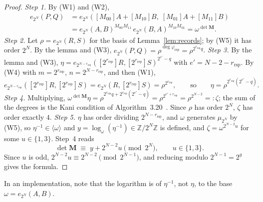 \documentclass[version=submission]{iacrcc}
\newcommand{\rrs}{r_{\mathrm{rsp}}}
\newcommand{\Mm}{\mathbf{M}}
\begin{document}
\begin{proof}
\emph{Step 1.} By (W1) and (W2),
\begin{align*}
  e_{2^N}(P, Q)
  &= e_{2^N}([M_{00}] A + [M_{10}] B,\; [M_{01}] A + [M_{11}] B) \\
  &= e_{2^N}(A, B)^{M_{00} M_{11}} \, e_{2^N}(B, A)^{M_{10} M_{01}}
  = \omega^{\det \Mm}.
\end{align*}
\emph{Step 2.} Let $\rho = e_{2^N}(R, S)$ for the basis of
Lemma~\ref{lem:records}; by (W5) it has order $2^N$. By the lemma and
(W3), $e_{2^N}(P, Q) = \rho^{\deg \varphi_{\mathrm{rsp}}} = \rho^{2^{\rrs}
q}$.
\emph{Step 3.} By the lemma and (W3), $\eta = e_{2^{N - \rrs}}([2^{\rrs}]
R, [2^{\rrs}] S)^{2^{e'} - q}$ with $e' = N - 2 - \rrs$. By (W4) with
$m = 2^{\rrs}$, $n = 2^{N - \rrs}$, and then (W1),
\[
  e_{2^{N - \rrs}}([2^{\rrs}] R, [2^{\rrs}] S)
  = e_{2^N}(R, [2^{\rrs}] S) = \rho^{2^{\rrs}},
  \qquad\text{so}\qquad
  \eta = \rho^{2^{\rrs}(2^{e'} - q)}.
\]
\emph{Step 4.} Multiplying, $\omega^{\det \Mm} \eta = \rho^{2^{\rrs} q +
2^{\rrs} (2^{e'} - q)} = \rho^{2^{e' + \rrs}} = \rho^{2^{N - 2}} =:
\zeta$; the sum of the degrees is the Kani condition of
Algorithm~3.20~\cite{kani}. Since $\rho$ has order $2^N$, $\zeta$ has
order exactly $4$.
\emph{Step 5.} $\eta$ has order dividing $2^{N - \rrs}$, and $\omega$ generates $\mu_{2^N}$ by (W5), so $\eta^{-1} \in \langle \omega \rangle$ and $y
= \log_\omega(\eta^{-1}) \in \mathbb{Z}/2^N\mathbb{Z}$ is defined, and
$\zeta = \omega^{2^{N - 2} u}$ for some $u \in \{1, 3\}$. Step~4 reads
\begin{equation}
\label{eq:det-full}
  \det \Mm \;\equiv\; y + 2^{N - 2} u \pmod{2^N}, \qquad u \in \{1, 3\}.
\end{equation}
Since $u$ is odd, $2^{N - 2} u \equiv 2^{N - 2} \pmod{2^{N - 1}}$, and
reducing modulo $2^{N - 1} = 2^g$ gives the formula.
\end{proof}

In an implementation, note that the logarithm is of $\eta^{-1}$, not $\eta$, to the base $\omega = e_{2^N}(A, B)$.
\end{document}
